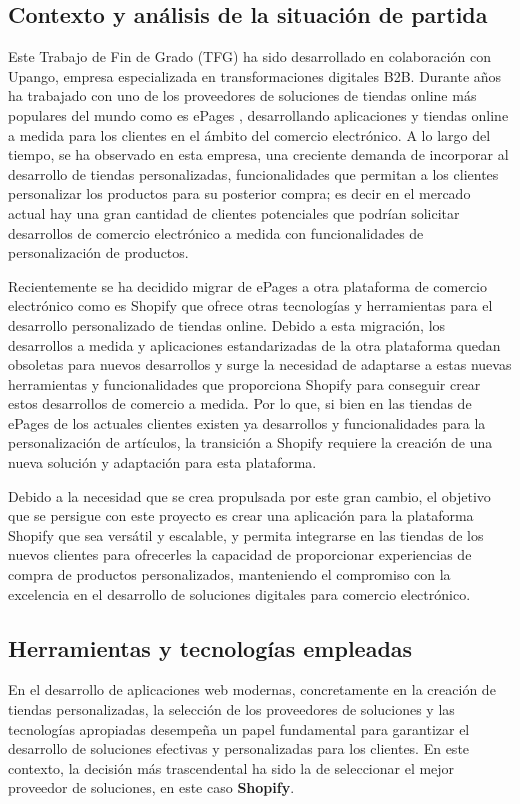 \documentclass[12pt]{article}
\begin{document}
\subsection{Contexto y análisis de la situación de partida}
Este Trabajo de Fin de Grado (TFG) ha sido desarrollado en colaboración con Upango, empresa especializada en transformaciones digitales B2B.
Durante años ha trabajado con uno de los proveedores de soluciones de tiendas online más populares del mundo como es ePages \cite{epages},
desarrollando aplicaciones y tiendas online a medida para los clientes en el ámbito del comercio electrónico. A lo largo del tiempo,
se ha observado en esta empresa, una creciente demanda de incorporar al desarrollo de tiendas personalizadas, funcionalidades que permitan a los clientes
personalizar los productos para su posterior compra; es decir en el mercado actual hay una gran cantidad de clientes potenciales que podrían solicitar desarrollos de comercio
electrónico a medida con funcionalidades de personalización de productos.

Recientemente se ha decidido migrar de ePages a otra plataforma de comercio electrónico como es Shopify \cite{shopify} que ofrece otras tecnologías y herramientas
para el desarrollo personalizado de tiendas online. Debido a esta migración, los desarrollos a medida y aplicaciones estandarizadas de la otra plataforma quedan obsoletas para nuevos desarrollos
y surge la necesidad de adaptarse a estas nuevas herramientas y funcionalidades que proporciona Shopify para conseguir crear estos desarrollos de comercio a medida. Por lo que, si
bien en las tiendas de ePages de los actuales clientes existen ya desarrollos y funcionalidades para la personalización de artículos, la transición a Shopify requiere la creación de
una nueva solución y adaptación para esta plataforma.

Debido a la necesidad que se crea propulsada por este gran cambio, el objetivo que se persigue con este proyecto es crear una aplicación para la plataforma Shopify que sea versátil y escalable,
y permita integrarse en las tiendas de los nuevos clientes para ofrecerles la capacidad de proporcionar experiencias de compra de productos personalizados,
manteniendo el compromiso con la excelencia en el desarrollo de soluciones digitales para comercio electrónico.

\subsection{Herramientas y tecnologías empleadas}
En el desarrollo de aplicaciones web modernas, concretamente en la creación de tiendas personalizadas, la selección de los proveedores de soluciones
y las tecnologías apropiadas desempeña un papel fundamental para garantizar el desarrollo de soluciones efectivas y personalizadas para los clientes.
En este contexto, la decisión más trascendental ha sido la de seleccionar el mejor proveedor de soluciones, en este caso \textbf{Shopify}.
\end{document}
